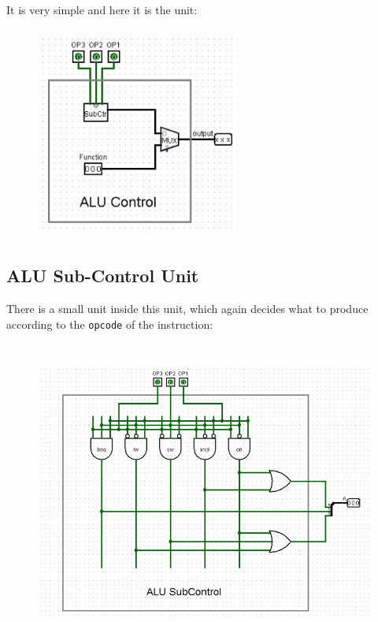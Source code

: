 \documentclass[12pt, dvipsnames, svgnames, x11names, oneside]{book}
\begin{document}
It is very simple and here it is the unit:
\begin{figure}[H]
\begin{center}
\includegraphics[width=0.6\textwidth, height=7cm]{./images/alumainctrl}
\end{center}
\end{figure}

\clearpage
\subsection{ALU Sub-Control Unit}
There is a small unit inside this unit, which again decides what to produce according to the \texttt{opcode} of the instruction:

\begin{figure}[H]
\begin{center}
\includegraphics[width=\textwidth, height=10cm]{./images/aluctrl}
\end{center}
\end{figure}
\end{document}
